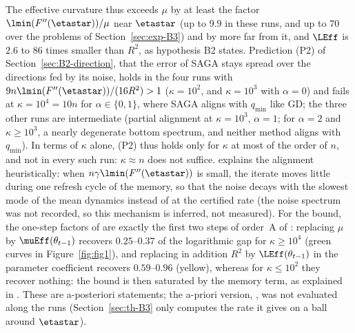 The effective curvature thus exceeds $\mu$ by at least the factor $\lmin(F''(\etastar))/\mu$ near $\etastar$ (up to $9.9$
in these runs, and up to $70$ over the problems of Section~\ref{sec:exp-B3}) and by more far from it, and $\LEff$ is $2.6$
to $86$ times smaller than $R^2$, as hypothesis B2 states. Prediction (P2) of Section~\ref{sec:B2-direction}, that the
error of SAGA stays spread over the directions fed by its noise, holds in the four runs with
$9n\lmin(F''(\etastar))/(16R^2)>1$ ($\kappa=10^2$, and $\kappa=10^3$ with $\alpha=0$) and fails at $\kappa=10^4=10n$ for
$\alpha\in\{0,1\}$, where SAGA aligns with $q_{\min}$ like GD; the three other runs are intermediate (partial alignment at
$\kappa=10^3$, $\alpha=1$; for $\alpha=2$ and $\kappa\ge10^3$, a nearly degenerate bottom spectrum, and neither method
aligns with $q_{\min}$). In terms of $\kappa$ alone, (P2) thus holds only for $\kappa$ at most of the order of $n$, and not in every such
run: $\kappa\approx n$ does not suffice.  explains the alignment heuristically: when
$n\gamma\lmin(F''(\etastar))$ is small, the iterate moves little during one refresh cycle of the memory, so that the noise
decays with the slowest mode of the mean dynamics instead of at the certified rate (the noise spectrum was not recorded,
so this mechanism is inferred, not measured). For the bound, the one-step factors of  are exactly the
first two steps of order~A of : replacing $\mu$ by $\muEff(\theta_{t-1})$ recovers
$0.25$--$0.37$ of the logarithmic gap for $\kappa\ge10^4$ (green curves in Figure~\ref{fig:fig1}), and replacing in
addition $R^2$ by $\LEff(\theta_{t-1})$ in the parameter coefficient recovers $0.59$--$0.96$ (yellow), whereas for
$\kappa\le10^2$ they recover nothing: the bound is then saturated by the memory term, as explained in
. These are a-posteriori statements; the a-priori version, , was not
evaluated along the runs (Section~\ref{sec:th-B3} only computes the rate it gives on a ball around $\etastar$).

